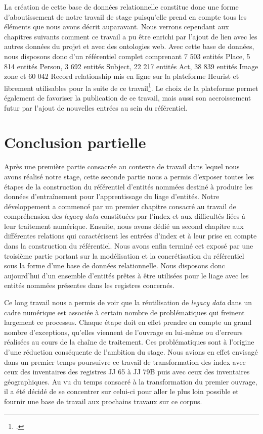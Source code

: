 \documentclass[a4paper,12pt,twoside]{book}
\begin{document}
	La création de cette base de données relationnelle constitue donc une forme d'aboutissement de notre travail de stage puisqu'elle prend en compte tous les éléments que nous avons décrit auparavant. Nous verrons cependant aux chapitres suivants comment ce travail a pu être enrichi par l'ajout de lien avec les autres données du projet et avec des ontologies web. Avec cette base de données, nous disposons donc d'un référentiel complet comprenant 7 503 entités Place, 5 814 entités Person, 3 692 entités Subject, 22 217 entités Act, 38 839 entités Image zone et 60 042 Record relationship mis en ligne sur la plateforme Heurist et librement utilisables pour la suite de ce travail\footcite{stutzmann_himanis_2022}. Le choix de la plateforme permet également de favoriser la publication de ce travail, mais aussi son accroissement futur par l'ajout de nouvelles entrées au sein du référentiel.
	
	\chapter*{Conclusion partielle}
	
	Après une première partie consacrée au contexte de travail dans lequel nous avons réalisé notre stage, cette seconde partie nous a permis d'exposer toutes les étapes de la construction du référentiel d'entités nommées destiné à produire les données d'entraînement pour l'apprentissage du liage d'entités. Notre développement a commencé par un premier chapitre consacré au travail de compréhension des \textit{legacy data} constituées par l'index et aux difficultés liées à leur traitement numérique. Ensuite, nous avons dédié un second chapitre aux différentes relations qui caractérisent les entrées d'index et à leur prise en compte dans la construction du référentiel. Nous avons enfin terminé cet exposé par une troisième partie portant sur la modélisation et la concrétisation du référentiel sous la forme d'une base de données relationnelle. Nous disposons donc aujourd'hui d'un ensemble d'entités prêtes à être utilisées pour le liage avec les entités nommées présentes dans les registres concernés.
	
	Ce long travail nous a permis de voir que la réutilisation de \textit{legacy data} dans un cadre numérique est associée à certain nombre de problématiques qui freinent largement ce processus. Chaque étape doit en effet prendre en compte un grand nombre d'exceptions, qu'elles viennent de l'ouvrage en lui-même ou d'erreurs réalisées au cours de la chaîne de traitement. Ces problématiques sont à l'origine d'une réduction conséquente de l'ambition du stage. Nous avions en effet envisagé dans un premier temps poursuivre ce travail de transformation des index avec ceux des inventaires des registres JJ 65 à JJ 79B puis avec ceux des inventaires géographiques. Au vu du temps consacré à la transformation du premier ouvrage, il a été décidé de se concentrer sur celui-ci pour aller le plus loin possible et fournir une base de travail aux prochains travaux sur ce corpus.
	
\end{document}
